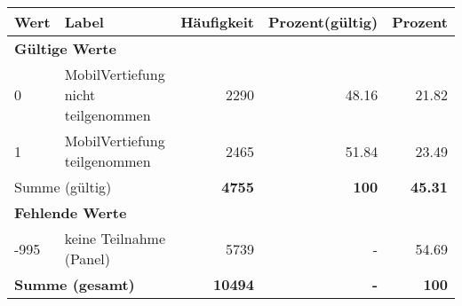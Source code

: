      \begin{longtable}{lXrrr}
     \toprule
     \textbf{Wert} & \textbf{Label} & \textbf{Häufigkeit} & \textbf{Prozent(gültig)} & \textbf{Prozent} \\
     \endhead
     \midrule
     \multicolumn{5}{l}{\textbf{Gültige Werte}}\\

     0 &
     \multicolumn{1}{X}{ MobilVertiefung nicht teilgenommen   } &


       \num{2290} &
       \num[round-mode=places,round-precision=2]{48.16} &
         \num[round-mode=places,round-precision=2]{21.82} \\

     1 &
     \multicolumn{1}{X}{ MobilVertiefung teilgenommen   } &


       \num{2465} &
       \num[round-mode=places,round-precision=2]{51.84} &
         \num[round-mode=places,round-precision=2]{23.49} \\
     \midrule
     \multicolumn{2}{l}{Summe (gültig)} &
       \textbf{\num{4755}} &
     \textbf{\num{100}} &
       \textbf{\num[round-mode=places,round-precision=2]{45.31}} \\
     \multicolumn{5}{l}{\textbf{Fehlende Werte}}\\
       -995 &
       keine Teilnahme (Panel) &
         \num{5739} &
        - &
         \num[round-mode=places,round-precision=2]{54.69} \\
     \midrule
     \multicolumn{2}{l}{\textbf{Summe (gesamt)}} &
          \textbf{\num{10494}} &
        \textbf{-} &
        \textbf{\num{100}} \\
     \bottomrule
     \end{longtable}
     
